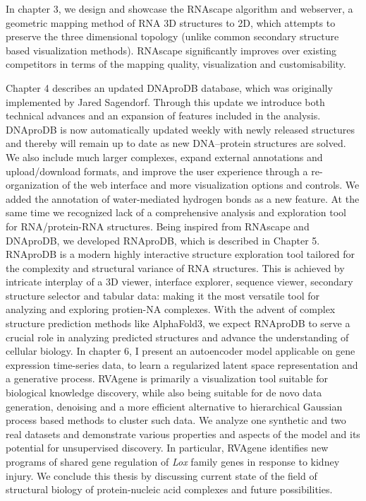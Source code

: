 In chapter 3, we design and showcase the RNAscape algorithm and webserver, a geometric mapping method of RNA 3D structures to 2D, which attempts to preserve the three dimensional topology (unlike common secondary structure based visualization methods). RNAscape significantly improves over existing competitors in terms of the mapping quality, visualization and customisability.

Chapter 4 describes an updated DNAproDB database, which was originally implemented by Jared Sagendorf. Through this update we
introduce both technical advances and an expansion of features included in the analysis.
DNAproDB is now automatically updated weekly with newly released structures and thereby will
remain up to date as new DNA–protein structures are solved. We also include much larger
complexes, expand external annotations and upload/download formats, and improve the user
experience through a re-organization of the web interface and more visualization options and
controls. We added the annotation of water-mediated hydrogen bonds as a new feature.
At the same time we recognized lack of a comprehensive analysis and exploration tool for RNA/protein-RNA structures. Being inspired from RNAscape and DNAproDB, we developed RNAproDB, which is described in Chapter 5. RNAproDB is a modern highly interactive structure exploration tool tailored for the complexity and structural variance of RNA structures. This is achieved by intricate interplay of a 3D viewer, interface explorer, sequence viewer, secondary structure selector and tabular data:  making it the most versatile tool for analyzing and exploring protien-NA complexes. With the advent of complex structure prediction methods like AlphaFold3, we expect RNAproDB to serve a crucial role in analyzing predicted structures and advance the understanding of cellular biology.
In chapter 6, I present an autoencoder model applicable on gene expression time-series data, to learn a regularized latent
space representation and a generative process. RVAgene is primarily a visualization tool suitable for biological
knowledge discovery, while also being suitable for de novo data generation, denoising and a more
efficient alternative to hierarchical Gaussian process based methods to cluster such data. We
analyze one synthetic and two real datasets and demonstrate various properties and aspects of the
model and its potential for unsupervised discovery.  In particular, RVAgene identifies new programs of
shared gene regulation of \textit{Lox} family genes in response to kidney injury. We conclude this thesis by discussing current state of the field of structural biology of protein-nucleic acid complexes and future possibilities.
